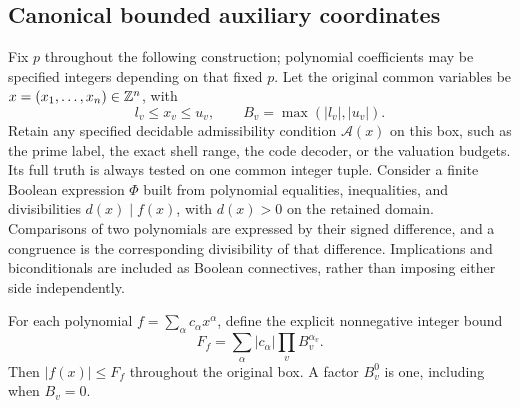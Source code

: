 

\subsection{Canonical bounded auxiliary coordinates}

Fix \(p\) throughout the following construction; polynomial
coefficients may be specified integers depending on that fixed \(p\).
Let the original common variables be
\(x=(x_1,\ldots,x_n)\in\mathbb Z^n\), with
\[
 l_v\le x_v\le u_v,\qquad
 B_v=\max(|l_v|,|u_v|).
\]
Retain any specified decidable admissibility condition
\(\mathcal A(x)\) on this box, such as the prime label,
the exact shell range, the code decoder, or the valuation budgets.
Its full truth is always tested on one common integer tuple.
Consider a finite Boolean expression \(\Phi\) built from
polynomial equalities, inequalities, and divisibilities
\(d(x)\mid f(x)\), with \(d(x)>0\) on the retained domain.
Comparisons of two polynomials are expressed by their signed
difference, and a congruence is the corresponding divisibility
of that difference.  Implications and biconditionals are
included as Boolean connectives, rather than imposing
either side independently.

For each polynomial \(f=\sum_\alpha c_\alpha x^\alpha\),
define the explicit nonnegative integer bound
\[
 F_f=\sum_\alpha|c_\alpha|\prod_v B_v^{\alpha_v}.
\]
Then \(|f(x)|\le F_f\) throughout the original box.
A factor \(B_v^0\) is one, including when \(B_v=0\).

